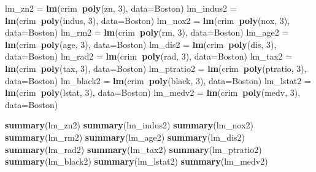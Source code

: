 \documentclass[]{article}
\newenvironment{Shaded}{\begin{snugshade}}{\end{snugshade}}
\newcommand{\DataTypeTok}[1]{\textcolor[rgb]{0.13,0.29,0.53}{#1}}
\newcommand{\DecValTok}[1]{\textcolor[rgb]{0.00,0.00,0.81}{#1}}
\newcommand{\KeywordTok}[1]{\textcolor[rgb]{0.13,0.29,0.53}{\textbf{#1}}}
\newcommand{\NormalTok}[1]{#1}
\newcommand{\OperatorTok}[1]{\textcolor[rgb]{0.81,0.36,0.00}{\textbf{#1}}}
\newcommand{\StringTok}[1]{\textcolor[rgb]{0.31,0.60,0.02}{#1}}
\begin{document}
\begin{Shaded}
\begin{Highlighting}[]
\NormalTok{lm_zn2 =}\StringTok{ }\KeywordTok{lm}\NormalTok{(crim}\OperatorTok{~}\KeywordTok{poly}\NormalTok{(zn, }\DecValTok{3}\NormalTok{), }\DataTypeTok{data=}\NormalTok{Boston)}
\NormalTok{lm_indus2 =}\StringTok{ }\KeywordTok{lm}\NormalTok{(crim}\OperatorTok{~}\KeywordTok{poly}\NormalTok{(indus, }\DecValTok{3}\NormalTok{), }\DataTypeTok{data=}\NormalTok{Boston)}
\NormalTok{lm_nox2 =}\StringTok{ }\KeywordTok{lm}\NormalTok{(crim}\OperatorTok{~}\KeywordTok{poly}\NormalTok{(nox, }\DecValTok{3}\NormalTok{), }\DataTypeTok{data=}\NormalTok{Boston)}
\NormalTok{lm_rm2 =}\StringTok{ }\KeywordTok{lm}\NormalTok{(crim}\OperatorTok{~}\KeywordTok{poly}\NormalTok{(rm, }\DecValTok{3}\NormalTok{), }\DataTypeTok{data=}\NormalTok{Boston)}
\NormalTok{lm_age2 =}\StringTok{ }\KeywordTok{lm}\NormalTok{(crim}\OperatorTok{~}\KeywordTok{poly}\NormalTok{(age, }\DecValTok{3}\NormalTok{), }\DataTypeTok{data=}\NormalTok{Boston)}
\NormalTok{lm_dis2 =}\StringTok{ }\KeywordTok{lm}\NormalTok{(crim}\OperatorTok{~}\KeywordTok{poly}\NormalTok{(dis, }\DecValTok{3}\NormalTok{), }\DataTypeTok{data=}\NormalTok{Boston)}
\NormalTok{lm_rad2 =}\StringTok{ }\KeywordTok{lm}\NormalTok{(crim}\OperatorTok{~}\KeywordTok{poly}\NormalTok{(rad, }\DecValTok{3}\NormalTok{), }\DataTypeTok{data=}\NormalTok{Boston)}
\NormalTok{lm_tax2 =}\StringTok{ }\KeywordTok{lm}\NormalTok{(crim}\OperatorTok{~}\KeywordTok{poly}\NormalTok{(tax, }\DecValTok{3}\NormalTok{), }\DataTypeTok{data=}\NormalTok{Boston)}
\NormalTok{lm_ptratio2 =}\StringTok{ }\KeywordTok{lm}\NormalTok{(crim}\OperatorTok{~}\KeywordTok{poly}\NormalTok{(ptratio, }\DecValTok{3}\NormalTok{), }\DataTypeTok{data=}\NormalTok{Boston)}
\NormalTok{lm_black2 =}\StringTok{ }\KeywordTok{lm}\NormalTok{(crim}\OperatorTok{~}\KeywordTok{poly}\NormalTok{(black, }\DecValTok{3}\NormalTok{), }\DataTypeTok{data=}\NormalTok{Boston)}
\NormalTok{lm_lstat2 =}\StringTok{ }\KeywordTok{lm}\NormalTok{(crim}\OperatorTok{~}\KeywordTok{poly}\NormalTok{(lstat, }\DecValTok{3}\NormalTok{), }\DataTypeTok{data=}\NormalTok{Boston)}
\NormalTok{lm_medv2 =}\StringTok{ }\KeywordTok{lm}\NormalTok{(crim}\OperatorTok{~}\KeywordTok{poly}\NormalTok{(medv, }\DecValTok{3}\NormalTok{), }\DataTypeTok{data=}\NormalTok{Boston)}

\KeywordTok{summary}\NormalTok{(lm_zn2)}
\KeywordTok{summary}\NormalTok{(lm_indus2)}
\KeywordTok{summary}\NormalTok{(lm_nox2)}
\KeywordTok{summary}\NormalTok{(lm_rm2)}
\KeywordTok{summary}\NormalTok{(lm_age2)}
\KeywordTok{summary}\NormalTok{(lm_dis2)}
\KeywordTok{summary}\NormalTok{(lm_rad2)}
\KeywordTok{summary}\NormalTok{(lm_tax2)}
\KeywordTok{summary}\NormalTok{(lm_ptratio2)}
\KeywordTok{summary}\NormalTok{(lm_black2)}
\KeywordTok{summary}\NormalTok{(lm_lstat2)}
\KeywordTok{summary}\NormalTok{(lm_medv2)}
\end{Highlighting}
\end{Shaded}
\end{document}
